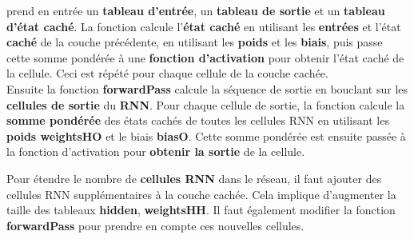 \documentclass[a4paper, 12pt, openany]{book}
\begin{document}
\begin{enumerate}
{    prend en entrée un \textbf{tableau d'entrée}, un \textbf{tableau de sortie} et un \textbf{tableau d'état caché}. La fonction calcule l'\textbf{état caché} en utilisant les \textbf{entrées} et l'état \textbf{caché}
    de la couche précédente, en utilisant les \textbf{poids} et les \textbf{biais}, puis passe cette somme pondérée à une \textbf{fonction d'activation} pour obtenir l'état caché de la cellule. Ceci est répété pour chaque 
    cellule de la couche cachée. \\
    Ensuite la fonction \textbf{forwardPass} calcule la séquence de sortie en bouclant sur les \textbf{cellules de sortie} du \textbf{RNN}. Pour chaque cellule de sortie, la fonction calcule la \textbf{somme pondérée} des états
    cachés de toutes les cellules RNN en utilisant les \textbf{poids weightsHO} et le biais \textbf{biasO}. Cette somme pondérée est ensuite passée à la fonction d'activation pour \textbf{obtenir la sortie} de la cellule.
  
    Pour étendre le nombre de \textbf{cellules RNN} dans le réseau, il faut ajouter des cellules RNN supplémentaires à la couche cachée. Cela implique d'augmenter la taille des tableaux \textbf{hidden}, \textbf{weightsHH}.
    Il faut également modifier la fonction \textbf{forwardPass} pour prendre en compte ces nouvelles cellules.
  }
\end{enumerate}
\end{document}
